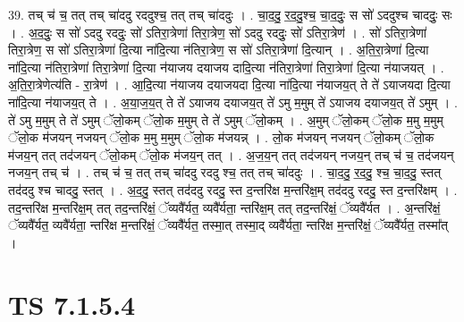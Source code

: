 \documentclass[17pt]{extarticle}
\begin{document}
39. तच् च॑ च॒ तत् तच् चा॑ददु रददुश्च॒ तत् तच् चा॑ददुः । . चा॒द॒दु॒ र॒द॒दु॒श्च॒ चा॒द॒दुः॒ स सो॑ ऽददुश्च चाददुः॒ सः । . अ॒द॒दुः॒ स सो॑ ऽददु रददुः॒ सो॑ ऽतिरा॒त्रेणा॑ तिरा॒त्रेण॒ सो॑ ऽददु रददुः॒ सो॑ ऽतिरा॒त्रेण॑ । . सो॑ ऽतिरा॒त्रेणा॑ तिरा॒त्रेण॒ स सो॑ ऽतिरा॒त्रेणा॑ दि॒त्या ना॑दि॒त्या न॑तिरा॒त्रेण॒ स सो॑ ऽतिरा॒त्रेणा॑ दि॒त्यान् । . अ॒ति॒रा॒त्रेणा॑ दि॒त्या ना॑दि॒त्या न॑तिरा॒त्रेणा॑ तिरा॒त्रेणा॑ दि॒त्या न॑याजय दयाजय दादि॒त्या न॑तिरा॒त्रेणा॑ तिरा॒त्रेणा॑ दि॒त्या न॑याजयत् । . अ॒ति॒रा॒त्रेणेत्य॑ति - रा॒त्रेण॑ । . आ॒दि॒त्या न॑याजय दयाजयदा दि॒त्या ना॑दि॒त्या न॑याजय॒त् ते ते॑ ऽयाजयदा दि॒त्या ना॑दि॒त्या न॑याजय॒त् ते । . अ॒या॒ज॒य॒त् ते ते॑ ऽयाजय दयाजय॒त् ते॑ ऽमु म॒मुम् ते॑ ऽयाजय दयाजय॒त् ते॑ ऽमुम् । . ते॑ ऽमु म॒मुम् ते ते॑ ऽमुम् ॅलो॒कम् ॅलो॒क म॒मुम् ते ते॑ ऽमुम् ॅलो॒कम् । . अ॒मुम् ॅलो॒कम् ॅलो॒क म॒मु म॒मुम् ॅलो॒क म॑जयन् नजयन् ॅलो॒क म॒मु म॒मुम् ॅलो॒क म॑जयन्न् । . लो॒क म॑जयन् नजयन् ॅलो॒कम् ॅलो॒क म॑जय॒न् तत् तद॑जयन् ॅलो॒कम् ॅलो॒क म॑जय॒न् तत् । . अ॒ज॒य॒न् तत् तद॑जयन् नजय॒न् तच् च॑ च॒ तद॑जयन् नजय॒न् तच् च॑ । . तच् च॑ च॒ तत् तच् चा॑ददु रददु श्च॒ तत् तच् चा॑ददुः । . चा॒द॒दु॒ र॒द॒दु॒ श्च॒ चा॒द॒दु॒ स्तत् तद॑ददु श्च चाददु॒ स्तत् । . अ॒द॒दु॒ स्तत् तद॑ददु रददु॒ स्त द॒न्तरि॑क्ष म॒न्तरि॑क्ष॒म् तद॑ददु रददु॒ स्त द॒न्तरि॑क्षम् । . तद॒न्तरि॑क्ष म॒न्तरि॑क्ष॒म् तत् तद॒न्तरि॑क्षं॒ ॅव्यवै᳚र्यत॒ व्यवै᳚र्यता॒ न्तरि॑क्ष॒म् तत् तद॒न्तरि॑क्षं॒ ॅव्यवै᳚र्यत । . अ॒न्तरि॑क्षं॒ ॅव्यवै᳚र्यत॒ व्यवै᳚र्यता॒ न्तरि॑क्ष म॒न्तरि॑क्षं॒ ॅव्यवै᳚र्यत॒ तस्मा॒त् तस्मा॒द् व्यवै᳚र्यता॒ न्तरि॑क्ष म॒न्तरि॑क्षं॒ ॅव्यवै᳚र्यत॒ तस्मा᳚त् । \newline
\pagebreak
{}

\section{ TS 7.1.5.4 }
\end{document}
